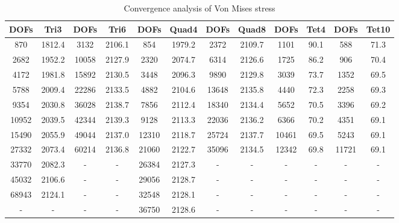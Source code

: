 \begin{table}[ht]
	\caption{Convergence analysis of Von Mises stress} \label{tab: 2DConvergence}
	\begin{tabular}{ c | c | c | c | c | c | c | c | c| c |c |c } 	
		DOFs & Tri3 & DOFs & Tri6 & DOFs & Quad4 & DOFs & Quad8 &DOFs&Tet4&DOFs&Tet10 \\ \hline
		870 & 1812.4 & 3132 & 2106.1 & 854 & 1979.2& 2372  & 2109.7 &1101&90.1&588&71.3 \\ 
		2682 & 1952.2 & 10058 & 2127.9 & 2320 & 2074.7&6314 & 2126.6&1725 & 86.2 & 906 & 70.4\\
		4172 & 1981.8 & 15892 &2130.5 & 3448 & 2096.3&  9890 & 2129.8& 3039 & 73.7 & 1352 & 69.5\\
		5788 & 2009.4 &  22286 &2133.5 & 4882& 2104.6 &13648 & 2135.8&4440 & 72.3 &  2258 &  69.3\\
		9354 & 2030.8 &  36028 &2138.7 & 7856 & 2112.4&18340 & 2134.4&5652 & 70.5 &  3396 & 69.2\\
		10952 & 2039.5 &  42344 &2139.3&  9128 & 2113.3&22036 & 2136.2 &6366 & 70.2 &  4351 & 69.1 \\
		15490 & 2055.9 &   49044 &2137.0&  12310 & 2118.7&25724 & 2137.7& 10461 & 69.5 & 5243 & 69.1\\
		27332 & 2073.4 & 60214 &2136.8& 21060 & 2122.7&35096 & 2134.5 & 12342& 69.8& 11721&  69.1\\
		33770 &  2082.3& - & -  & 26384&2127.3&-&-&-&-&-&-\\
		45032 & 2106.6 & - & - & 29056&2128.7&-&-&-&-&-&-\\
		68943 & 2124.1 & - & - &  32548& 2128.1&-&-&-&-&-&-\\
		- & - & - & - &  36750& 2128.6&-&-&-&-&-&-\\
		\hline  
	\end{tabular}
\end{table}


